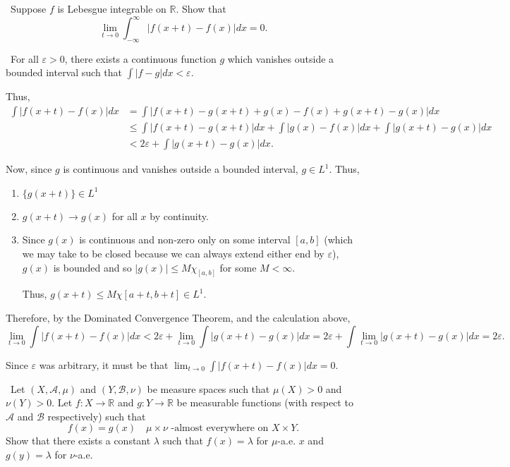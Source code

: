 \documentclass[12pt]{Homework}
\begin{document}
\begin{problem} $\,$
Suppose $f$ is Lebesgue integrable on $\mathbb{R}$. Show that $$\lim_{t\to0}\int_{-\infty}^\infty|f(x+t)-f(x)|dx=0.$$
\end{problem}


\begin{solution}$\,$
For all $\varepsilon>0$, there exists a continuous function $g$ which vanishes outside a bounded interval such that $\int|f-g|dx<\varepsilon$.

Thus, \begin{align*}
    \int|f(x+t)-f(x)|dx&=\int|f(x+t)-g(x+t)+g(x)-f(x)+g(x+t)-g(x)|dx\\
    &\le\int|f(x+t)-g(x+t)|dx+\int|g(x)-f(x)|dx+\int|g(x+t)-g(x)|dx\\
    &<2\varepsilon+\int|g(x+t)-g(x)|dx.
\end{align*}

Now, since $g$ is continuous and vanishes outside a bounded interval, $g\in L^1$. Thus, 
\begin{enumerate}
    \item $\{g(x+t)\}\in L^1$ 
    \item $g(x+t)\to g(x)$ for all $x$ by continuity.
    \item Since $g(x)$ is continuous and non-zero only on some interval $[a,b]$ (which we may take to be closed because we can always extend either end by $\varepsilon$), $g(x)$ is bounded and so $|g(x)|\le M\chi_{[a,b]}$ for some $M<\infty$.
    
    Thus, $g(x+t)\le M\chi{[a+t,b+t]}\in L^1$.
\end{enumerate}

Therefore, by the Dominated Convergence Theorem, and the calculation above, $$\lim_{t\to0}\int|f(x+t)-f(x)|dx< 2\varepsilon+\lim_{t\to0}\int|g(x+t)-g(x)|dx=2\varepsilon+\int\lim_{t\to0}|g(x+t)-g(x)|dx=2\varepsilon.$$

Since $\varepsilon$ was arbitrary, it must be that $\lim_{t\to0}\int|f(x+t)-f(x)|dx=0$.
\end{solution}
\newpage

\begin{problem} $\,$
Let $(X,\mathscr{A},\mu)$ and $(Y,\mathscr{B},\nu)$ be measure spaces such that $\mu(X)>0$ and $\nu(Y)>0$. Let $f:X\to\mathbb{R}$ and $g:Y\to\mathbb{R}$ be measurable functions (with respect to $\mathscr{A}$ and $\mathscr{B}$ respectively) such that $$f(x)=g(x)\quad \mu\times\nu\text{ -almost everywhere on }X\times Y.$$
Show that there exists a constant $\lambda$ such that $f(x)=\lambda$ for $\mu$-a.e. $x$ and $g(y)=\lambda$ for $\nu$-a.e.
\end{problem}
\end{document}
